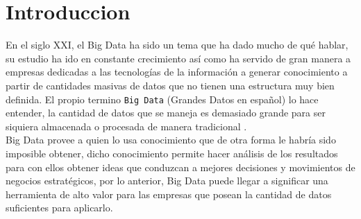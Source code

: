 \section{Introduccion}
En el siglo XXI, el Big Data ha sido un tema que ha dado mucho de qué hablar, su estudio ha ido en constante crecimiento así como ha servido de gran manera a empresas dedicadas a las tecnologías de la información a generar conocimiento a partir de cantidades masivas de datos que no tienen una estructura muy bien definida. 
El propio termino \texttt{Big Data} (Grandes Datos en español) lo hace entender, la cantidad de datos que se maneja es demasiado grande para ser siquiera almacenada o procesada de manera tradicional \cite{intro}. 
\\
Big Data provee a quien lo usa conocimiento que de otra forma le habría sido imposible obtener, dicho conocimiento permite hacer análisis de los resultados para con ellos obtener ideas que conduzcan a mejores decisiones y movimientos de negocios estratégicos, por lo anterior, Big Data puede llegar a significar una herramienta de alto valor para las empresas que posean la cantidad de datos suficientes para aplicarlo. 

